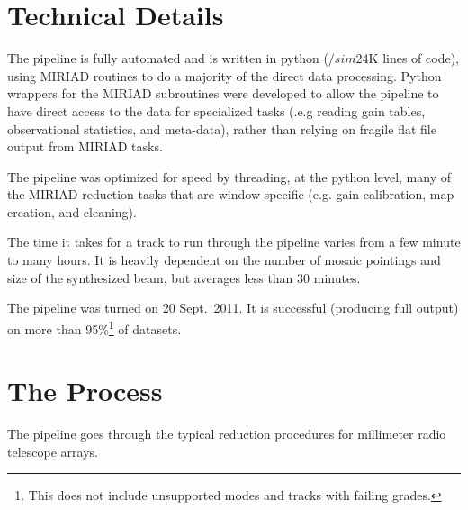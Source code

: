 \section{Technical Details}

The pipeline is fully automated and is written in python ($/sim$24K lines of code), using MIRIAD \citep{stw95} routines to do a majority of the direct data processing. Python wrappers for the MIRIAD subroutines were developed to allow the pipeline to have direct access to the data for specialized tasks (.e.g reading gain tables, observational statistics, and meta-data), rather than relying on fragile flat file output from MIRIAD tasks.

The pipeline was optimized for speed by threading, at the python level, many of the MIRIAD reduction tasks that are window specific (e.g. gain calibration, map creation, and cleaning).

The time it takes for a track to run through the pipeline varies from a few minute to many hours. It is heavily dependent on the number of mosaic pointings and size of the synthesized beam, but averages less than 30 minutes.

The pipeline was turned on 20 Sept.\ 2011. It is successful (producing full output) on more than 95\%\footnote{This does not include unsupported modes and tracks with failing grades.} of datasets.

\section{The Process}

The pipeline goes through the typical reduction procedures for millimeter radio telescope arrays.


